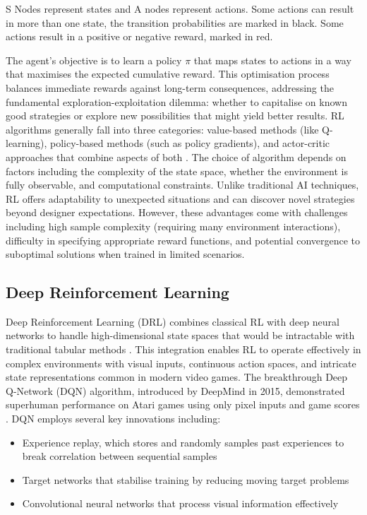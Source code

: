 S Nodes represent states and A nodes represent actions. 
Some actions can result in more than one state, the transition probabilities are marked in black. 
Some actions result in a positive or negative reward, marked in red.

The agent's objective is to learn a policy $\pi$ that maps states to actions in a way that maximises the expected cumulative reward. 
This optimisation process balances immediate rewards against long-term consequences, addressing the fundamental exploration-exploitation dilemma: whether to capitalise on known good strategies or explore new possibilities that might yield better results.
RL algorithms generally fall into three categories: value-based methods (like Q-learning), policy-based methods (such as policy gradients), and actor-critic approaches that combine aspects of both \cite{openai_spinningup_rl}. 
The choice of algorithm depends on factors including the complexity of the state space, whether the environment is fully observable, and computational constraints.
Unlike traditional AI techniques, RL offers adaptability to unexpected situations and can discover novel strategies beyond designer expectations. 
However, these advantages come with challenges including high sample complexity (requiring many environment interactions), 
difficulty in specifying appropriate reward functions, and potential convergence to suboptimal solutions when trained in limited scenarios.

\subsection{Deep Reinforcement Learning}

Deep Reinforcement Learning (DRL) combines classical RL with deep neural networks to handle high-dimensional state spaces that would be intractable with traditional tabular methods \cite{li2018deepreinforcementlearning}. 
This integration enables RL to operate effectively in complex environments with visual inputs, continuous action spaces, and intricate state representations common in modern video games.
The breakthrough Deep Q-Network (DQN) algorithm, introduced by DeepMind in 2015, demonstrated superhuman performance on Atari games using only pixel inputs and game scores \cite{deepmind_alphago}. DQN employs several key innovations including:

\begin{itemize}
    \item Experience replay, which stores and randomly samples past experiences to break correlation between sequential samples
    \item Target networks that stabilise training by reducing moving target problems
    \item Convolutional neural networks that process visual information effectively
\end{itemize}

